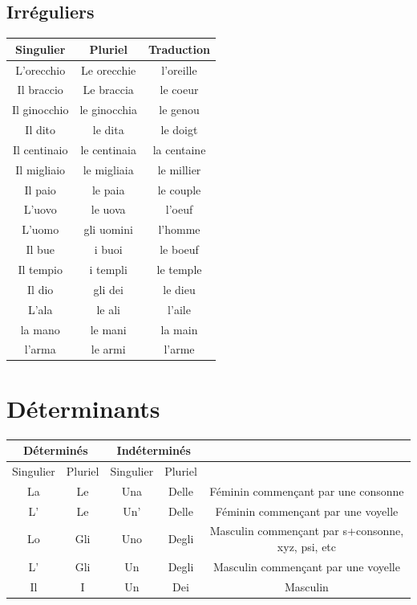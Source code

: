 \documentclass[12pt, openany]{report}
\begin{document}
\subsection{Irréguliers}
\begin{center}
    \begin{tabular}{c|c|c}
        Singulier & Pluriel & Traduction\\ \hline 
        L'orecchio & Le orecchie & l'oreille \\
        Il braccio & Le braccia & le coeur \\
        Il ginocchio & le ginocchia & le genou\\
        Il dito & le dita & le doigt\\
        Il centinaio & le centinaia & la centaine \\
        Il migliaio & le migliaia & le millier \\
        Il paio & le paia & le couple \\
        L'uovo & le uova & l'oeuf \\
        L'uomo & gli uomini & l'homme\\
        Il bue & i buoi & le boeuf\\
        Il tempio & i templi & le temple \\
        Il dio & gli dei & le dieu\\
        L'ala & le ali &l'aile \\
        la mano & le mani & la main\\
        l'arma & le armi & l'arme\\
    \end{tabular}
\end{center}
\section{Déterminants}
\begin{center}
    \begin{tabular}{c|c|c|c|c}
        \multicolumn{2}{c|}{Déterminés} & \multicolumn{2}{c|}{Indéterminés} & \\ \hline
        Singulier & Pluriel & Singulier & Pluriel & \\
        La & Le & Una & Delle & Féminin commençant par une consonne \\ 
        L' & Le & Un' & Delle & Féminin commençant par une voyelle \\ 
        Lo & Gli & Uno & Degli & Masculin commençant par s+consonne, xyz, psi, etc\\ 
        L' & Gli & Un & Degli & Masculin commençant par une voyelle \\ 
        Il & I & Un & Dei & Masculin \\ 
    \end{tabular}    
\end{center}
\end{document}
